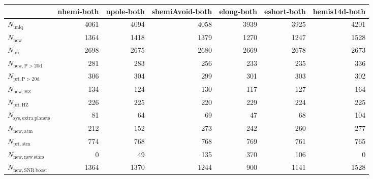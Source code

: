 \begin{tabular}{lrrrrrr}
\toprule
{} &  nhemi-both &  npole-both &  shemiAvoid-both &  elong-both &  eshort-both &  hemis14d-both \\
\midrule
$N_{\mathrm{uniq}}$               &        4061 &        4094 &             4058 &        3939 &         3925 &           4201 \\
$N_{\mathrm{new}}$                &        1364 &        1418 &             1379 &        1270 &         1247 &           1528 \\
$N_{\mathrm{pri}}$                &        2698 &        2675 &             2680 &        2669 &         2678 &           2673 \\
$N_{\mathrm{new,P>20d}}$          &         281 &         283 &              256 &         233 &          235 &            336 \\
$N_{\mathrm{pri,P>20d}}$          &         306 &         304 &              299 &         301 &          303 &            302 \\
$N_{\mathrm{new,HZ}}$             &         134 &         124 &              130 &         117 &          127 &            164 \\
$N_{\mathrm{pri,HZ}}$             &         226 &         225 &              220 &         229 &          224 &            225 \\
$N_{\mathrm{sys,extra\ planets}}$ &          81 &          64 &               69 &          47 &           68 &            104 \\
$N_{\mathrm{new,atm}}$            &         212 &         152 &              273 &         242 &          260 &            277 \\
$N_{\mathrm{pri,atm}}$            &         774 &         768 &              768 &         769 &          761 &            765 \\
$N_{\mathrm{new,new\ stars}}$     &           0 &          49 &              135 &         370 &          106 &              0 \\
$N_{\mathrm{new,SNR\ boost}}$     &        1364 &        1370 &             1244 &         900 &         1141 &           1528 \\
\bottomrule
\end{tabular}

